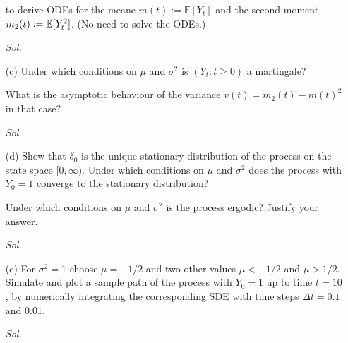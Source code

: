 \begin{enumerate}
        to derive ODEs for the meane $m(t) := \mathbb{E}[Y_t]$ and the second moment $m_2(t) := \mathbb{E}[Y_t^2]$. (No need to solve the ODEs.)

        \textit{ Sol. }

    \item[(c)] Under which conditions on $\mu$ and $\sigma^2$ is $(Y_t: t \ge 0)$ a martingale? 
    
    What is the asymptotic behaviour of the variance $v(t) = m_2(t) - m(t)^2$ in that case?
    
        \textit{ Sol. }

    \item[(d)] Show that $\delta_0$ is the unique stationary distribution of the process on the state space $[0, \infty)$. Under which conditions on $\mu$ and $\sigma^2$ does the process with $Y_0 = 1$ converge to the stationary distribution?
    
    Under which conditions on $\mu$ and $\sigma^2$ is the process ergodic? Justify your answer.

        \textit{ Sol. }

    \item[(e)] For $\sigma^2 = 1$ choose $\mu = -1/2$ and two other values $\mu < -1/2$ and $\mu > 1/2$. Simulate and plot a sample path of the process with $Y_0 = 1$ up to time $t = 10$, by numerically integrating the corresponding SDE with time steps $\Delta t = 0.1$ and $0.01$.
    
        \textit{ Sol. }

\end{enumerate}